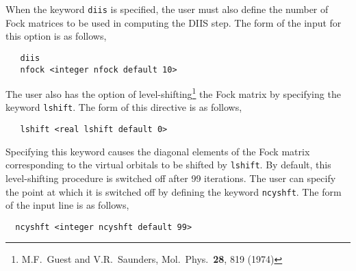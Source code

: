 When the keyword \verb+diis+ is specified, the user must also define
the number of Fock matrices to be used in computing the DIIS step.  The
form of the input for this option is as follows,


\begin{verbatim}
   diis
   nfock <integer nfock default 10>
\end{verbatim}

The user also has the option of level-shifting\footnote {M.F.~Guest and 
V.R.~Saunders, Mol.~Phys.~{\bf 28}, 819 (1974)} the Fock matrix by specifying
the keyword \verb+lshift+.  The form of this directive is as follows,

\begin{verbatim}
   lshift <real lshift default 0> 
\end{verbatim}

Specifying this keyword causes the diagonal elements of the Fock matrix
corresponding to the virtual orbitals to be shifted by \verb+lshift+.
By default, this level-shifting procedure is switched off after 99 iterations.
The user can specify the point at which it is switched off by defining
the keyword {\tt ncyshft}.  The form of the input line is as follows,

\begin{verbatim}
  ncyshft <integer ncyshft default 99> 
\end{verbatim}


